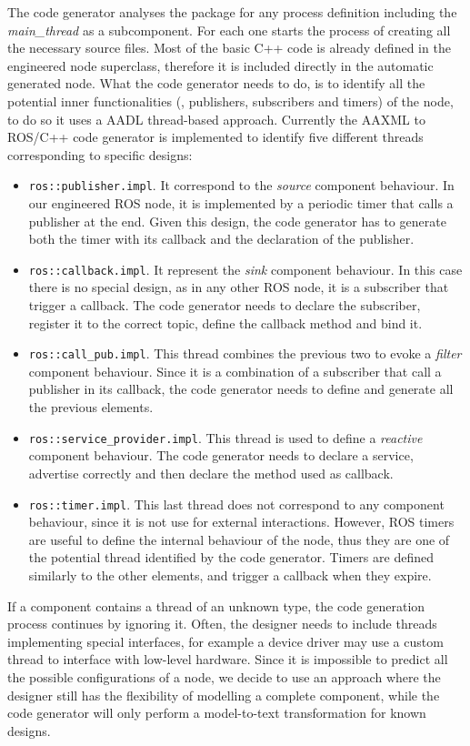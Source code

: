 The code generator analyses the package for any process definition including the \textit{main\_thread} as a subcomponent. For each one starts the process of creating all the necessary source files. Most of the basic C++ code is already defined in the engineered node superclass, therefore it is included directly in the automatic generated node. What the code generator needs to do, is to identify all the potential inner functionalities (\ie, publishers, subscribers and timers) of the node, to do so it uses a AADL thread-based approach. Currently the AAXML to ROS/C++ code generator is implemented to identify five different threads corresponding to specific designs:
\begin{itemize}
\item \texttt{ros::publisher.impl}. It correspond to the \textit{source} component behaviour. In our  engineered ROS node, it is implemented by a periodic timer that calls a publisher at the end. Given this design, the code generator has to generate both the timer with its callback and the declaration of the publisher.
\item \texttt{ros::callback.impl}. It represent the \textit{sink} component behaviour. In this case there is no special design, as in any other ROS node, it is a subscriber that trigger a callback. The code generator needs to declare the subscriber, register it to the correct topic, define the callback method and bind it.
\item \texttt{ros::call\_pub.impl}. This thread combines the previous two to evoke a \textit{filter} component behaviour. Since it is a combination of a subscriber that call a publisher in its callback, the code generator needs to define and generate all the previous elements.
\item \texttt{ros::service\_provider.impl}. This thread is used to define a \textit{reactive} component behaviour. The code generator needs to declare a service, advertise correctly and then declare the method used as callback.
\item \texttt{ros::timer.impl}. This last thread does not correspond to any component behaviour, since it is not use for external interactions. However, ROS timers are useful to define the internal behaviour of the node, thus they are one of the potential thread identified by the code generator. Timers are defined similarly to the other elements, and trigger a callback when they expire.
\end{itemize}
If a component contains a thread of an unknown type, the code generation process continues by ignoring it. Often, the designer needs to include threads implementing special interfaces, for example a device driver may use a custom thread to interface with low-level hardware. Since it is impossible to predict all the possible configurations of a node, we decide to use an approach where the designer still has the flexibility of modelling a complete component, while the code generator will only perform a model-to-text transformation for known designs.

